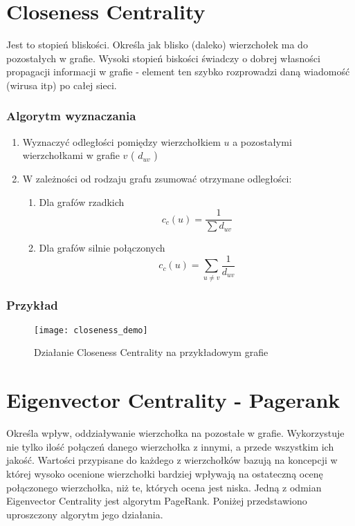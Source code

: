\section{Closeness Centrality}

Jest to stopień bliskości. Określa jak blisko (daleko) wierzchołek ma do pozostałych w grafie. Wysoki stopień biskości świadczy o dobrej własności propagacji informacji w grafie - element ten szybko rozprowadzi daną wiadomość (wirusa itp) po całej sieci.


\subsubsection{Algorytm wyznaczania}
\begin{enumerate}
\item Wyznaczyć odległości pomiędzy wierzchołkiem $u$ a pozostałymi wierzchołkami w grafie $v$  ( $d_{uv}$ )
\item W zależności od rodzaju grafu zsumować otrzymane odległości:
\begin{enumerate}
\item Dla grafów rzadkich $$ c_c(u) = \frac{1}{\sum d_{uv} }$$
\item Dla grafów silnie połączonych $$ c_c(u) = \sum_{u \neq v} \frac{1}{d_{uv} }$$
\end{enumerate}
\end{enumerate}

\newpage
\FloatBarrier
\subsubsection{Przykład}
\begin{figure}[h]
\centering
\texttt{[image: closeness\_demo]}
\caption{Działanie Closeness Centrality  na przykładowym grafie}
\end{figure}
\FloatBarrier

\section{Eigenvector Centrality - Pagerank}
Określa wpływ, oddziaływanie wierzchołka na pozostałe w grafie. Wykorzystuje nie tylko ilość połączeń danego wierzchołka z innymi, a przede wszystkim ich jakość. Wartości przypisane do każdego z wierzchołków bazują na koncepcji w której wysoko ocenione wierzchołki bardziej wpływają na ostateczną ocenę połączonego wierzchołka, niż te, których ocena jest niska. Jedną z odmian Eigenvector Centrality jest algorytm PageRank. Poniżej przedstawiono uproszczony algorytm jego działania.


